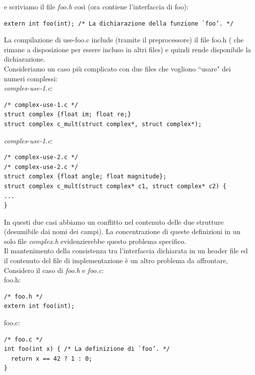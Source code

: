 \documentclass[a4paper,12pt, oneside]{book}
\begin{document}
e scriviamo il file \textit{foo.h} così (ora contiene l'interfaccia di foo):
\begin{verbatim}
extern int foo(int); /* La dichiarazione della funzione `foo’. */
\end{verbatim}
La compilazione di use-foo.c include (tramite il preprocessore) il file
foo.h ( che rimane a disposizione per essere incluso in altri files) e quindi rende disponibile la dichiarazione.\\
Consideriamo un caso più complicato con due files che vogliono “usare" dei
numeri complessi:
\\
\textit{comples-use-1.c}:
\begin{verbatim}
/* complex-use-1.c */
struct complex {float im; float re;}
struct complex c_mult(struct complex*, struct complex*);
\end{verbatim}
\textit{comples-use-1.c}:
\begin{verbatim}
/* complex-use-2.c */
/* complex-use-2.c */
struct complex {float angle; float magnitude};
struct complex c_mult(struct complex* c1, struct complex* c2) {
...
}
\end{verbatim}
In questi due casi abbiamo un conflitto nel contenuto delle due strutture (desumibile dai nomi dei campi). La concentrazione di queste definizioni in un solo file \textit{complex.h }evidenzierebbe questo problema specifico.\\
Il mantenimento della consistenza tra l’interfaccia dichiarata in un header file ed il
contenuto del file di implementazione è un altro problema da affrontare, Considero il caso di \textit{foo.h} e \textit{foo.c}:\\
foo.h:
\begin{verbatim}
/* foo.h */
extern int foo(int);
\end{verbatim}
foo.c:
\begin{verbatim}
/* foo.c */
int foo(int x) { /* La definizione di `foo’. */
  return x == 42 ? 1 : 0;
}
\end{verbatim}
\end{document}
